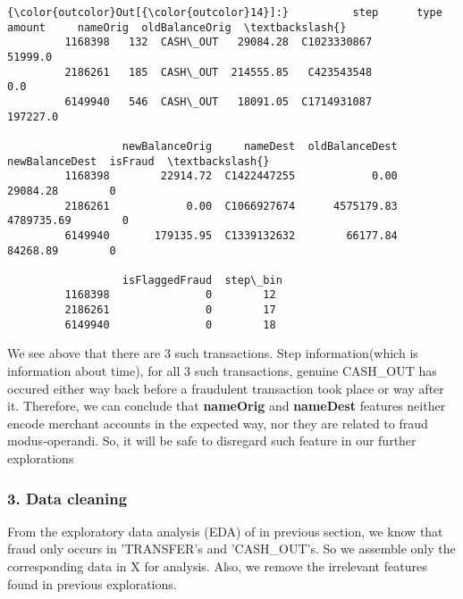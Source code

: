 \documentclass[11pt]{article}
\begin{document}
\begin{Verbatim}[commandchars=\\\{\}]
{\color{outcolor}Out[{\color{outcolor}14}]:}          step      type     amount     nameOrig  oldBalanceOrig  \textbackslash{}
         1168398   132  CASH\_OUT   29084.28  C1023330867         51999.0   
         2186261   185  CASH\_OUT  214555.85   C423543548             0.0   
         6149940   546  CASH\_OUT   18091.05  C1714931087        197227.0   
         
                  newBalanceOrig     nameDest  oldBalanceDest  newBalanceDest  isFraud  \textbackslash{}
         1168398        22914.72  C1422447255            0.00        29084.28        0   
         2186261            0.00  C1066927674      4575179.83      4789735.69        0   
         6149940       179135.95  C1339132632        66177.84        84268.89        0   
         
                  isFlaggedFraud  step\_bin  
         1168398               0        12  
         2186261               0        17  
         6149940               0        18  
\end{Verbatim}
            
    We see above that there are 3 such transactions. Step information(which
is information about time), for all 3 such transactions, genuine
CASH\_OUT has occured either way back before a fraudulent transaction
took place or way after it. Therefore, we can conclude that
\textbf{nameOrig} and \textbf{nameDest} features neither encode merchant
accounts in the expected way, nor they are related to fraud
modus-operandi. So, it will be safe to disregard such feature in our
further explorations

    \subsubsection{3. Data cleaning}\label{data-cleaning}

    From the exploratory data analysis (EDA) of in previous section, we know
that fraud only occurs in 'TRANSFER's and 'CASH\_OUT's. So we assemble
only the corresponding data in X for analysis. Also, we remove the
irrelevant features found in previous explorations.
\end{document}
